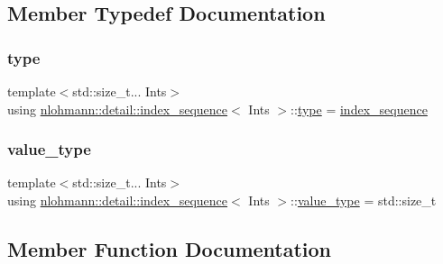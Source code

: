 \subsection{Member Typedef Documentation}
\mbox{\label{structnlohmann_1_1detail_1_1index__sequence_a3c14c4ab277de72b166806193ff4fa10}} 
\subsubsection{\texorpdfstring{type}{type}}
{\footnotesize\ttfamily template$<$std\+::size\+\_\+t... Ints$>$ \\
using \hyperlink{structnlohmann_1_1detail_1_1index__sequence}{nlohmann\+::detail\+::index\+\_\+sequence}$<$ Ints $>$\+::\hyperlink{structnlohmann_1_1detail_1_1index__sequence_a3c14c4ab277de72b166806193ff4fa10}{type} =  \hyperlink{structnlohmann_1_1detail_1_1index__sequence}{index\+\_\+sequence}}

\mbox{\label{structnlohmann_1_1detail_1_1index__sequence_a2eca43d08fc1eb68bd5fa75b6714d21d}} 
\subsubsection{\texorpdfstring{value\+\_\+type}{value\_type}}
{\footnotesize\ttfamily template$<$std\+::size\+\_\+t... Ints$>$ \\
using \hyperlink{structnlohmann_1_1detail_1_1index__sequence}{nlohmann\+::detail\+::index\+\_\+sequence}$<$ Ints $>$\+::\hyperlink{structnlohmann_1_1detail_1_1index__sequence_a2eca43d08fc1eb68bd5fa75b6714d21d}{value\+\_\+type} =  std\+::size\+\_\+t}



\subsection{Member Function Documentation}
\mbox{\label{structnlohmann_1_1detail_1_1index__sequence_a7ac529419787d775f52408135304b337}} 
